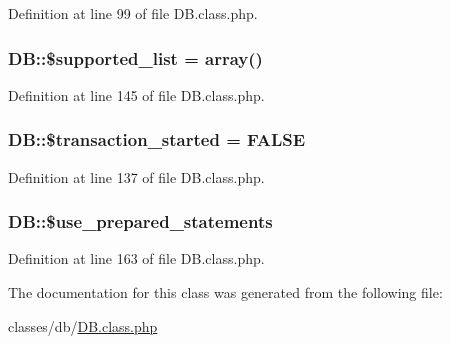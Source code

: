 Definition at line 99 of file D\+B.\+class.\+php.

\hypertarget{classDB_ac09dd547a22963632e063c9ab68b7707}{
\subsubsection[{\$supported\+\_\+list}]{\setlength{\rightskip}{0pt plus 5cm}D\+B\+::\$supported\+\_\+list = array()}}\label{classDB_ac09dd547a22963632e063c9ab68b7707}


Definition at line 145 of file D\+B.\+class.\+php.

\hypertarget{classDB_a39a0eef56f82082ca4c69bcad1f12a31}{
\subsubsection[{\$transaction\+\_\+started}]{\setlength{\rightskip}{0pt plus 5cm}D\+B\+::\$transaction\+\_\+started = F\+A\+L\+S\+E}}\label{classDB_a39a0eef56f82082ca4c69bcad1f12a31}


Definition at line 137 of file D\+B.\+class.\+php.

\hypertarget{classDB_a9902aee7d8900a597670fce92c7eb74b}{
\subsubsection[{\$use\+\_\+prepared\+\_\+statements}]{\setlength{\rightskip}{0pt plus 5cm}D\+B\+::\$use\+\_\+prepared\+\_\+statements}}\label{classDB_a9902aee7d8900a597670fce92c7eb74b}


Definition at line 163 of file D\+B.\+class.\+php.



The documentation for this class was generated from the following file\+:\begin{DoxyCompactItemize}
\item 
classes/db/\hyperlink{DB_8class_8php}{D\+B.\+class.\+php}\end{DoxyCompactItemize}
